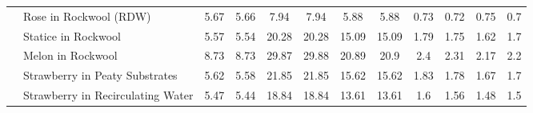 \documentclass[
  letterpaper,
  DIV=11,
  numbers=noendperiod]{scrreprt}
\begin{document}
\begin{landscape}
\begin{longtable}[t]{llcccccccccc}
\nopagebreak
 & Rose in Rockwool (RDW) & 5.67 & 5.66 & 7.94 & 7.94 & 5.88 & 5.88 & 0.73 & 0.72 & 0.75 & 0.7\\
\nopagebreak
\multirow[t]{-22}{*}{\raggedright\arraybackslash Floriculture} & Statice in Rockwool & 5.57 & 5.54 & 20.28 & 20.28 & 15.09 & 15.09 & 1.79 & 1.75 & 1.62 & 1.7\\
\cmidrule{1-12}\pagebreak[0]
 & Melon in Rockwool & 8.73 & 8.73 & 29.87 & 29.88 & 20.89 & 20.9 & 2.4 & 2.31 & 2.17 & 2.2\\
\nopagebreak
 & Strawberry in Peaty Substrates & 5.62 & 5.58 & 21.85 & 21.85 & 15.62 & 15.62 & 1.83 & 1.78 & 1.67 & 1.7\\
\nopagebreak
\multirow[t]{-3}{*}{\raggedright\arraybackslash Fruticulture} & Strawberry in Recirculating Water & 5.47 & 5.44 & 18.84 & 18.84 & 13.61 & 13.61 & 1.6 & 1.56 & 1.48 & 1.5\\*

\end{longtable}

\endgroup{}
\end{landscape}
\renewcommand{\arraystretch}{1}



\cleardoublepage
{}
{}

\end{document}
